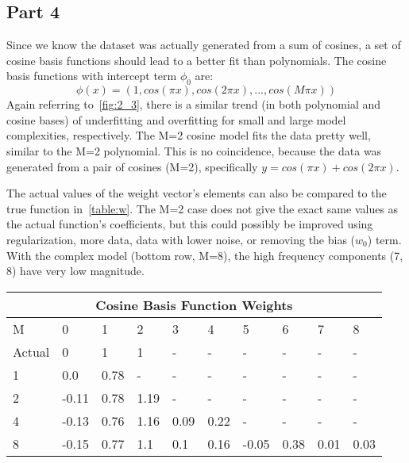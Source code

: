 \subsection{Part 4}
Since we know the dataset was actually generated from a sum of cosines, a set of cosine basis functions should lead to a better fit than polynomials.
The cosine basis functions with intercept term $\phi_0$ are:
\begin{equation}
	\phi(x)=(1, cos(\pi x), cos(2\pi x), ... , cos(M\pi x))
\end{equation}
Again referring to~\cref{fig:2_3}, there is a similar trend (in both polynomial and cosine bases) of underfitting and overfitting for small and large model complexities, respectively.
The M=2 cosine model fits the data pretty well, similar to the M=2 polynomial.
This is no coincidence, because the data was generated from a pair of cosines (M=2), specifically $y = cos(\pi x) + cos(2\pi x)$.

The actual values of the weight vector's elements can also be compared to the true function in~\cref{table:w}.
The M=2 case does not give the exact same values as the actual function's coefficients, but this could possibly be improved using regularization, more data, data with lower noise, or removing the bias ($w_0$) term.
With the complex model (bottom row, M=8), the high frequency components (7, 8) have very low magnitude.

\begin{table*}[t]
  \centering
  \caption[]{Cosine Basis Function Weights}
	\begin{tabular}{|p{1cm}||p{1cm}|p{1cm}|p{1cm}|p{1cm}|p{1cm}|p{1cm}|p{1cm}|p{1cm}|p{1cm}|}
	 \hline
	 \multicolumn{10}{|c|}{Cosine Basis Function Weights} \\
	 \hline
	 M & 0 & 1 & 2 & 3 & 4 & 5 & 6 & 7 & 8 \\
	 \hline\hline
	 Actual & 0 & 1 & 1 & - & - & - & - & - & - \\
	 1 & 0.0 & 0.78 & - & - & - & - & - & - & - \\
	 2 & -0.11 & 0.78 & 1.19 & - & - & - & - & - & - \\
	 4 & -0.13 & 0.76 & 1.16 & 0.09 & 0.22 & - & - & - & - \\
	 8 & -0.15 & 0.77 & 1.1 & 0.1 & 0.16 & -0.05 & 0.38 & 0.01 & 0.03  \\
	 \hline
	\end{tabular}
	\label{table:w}
\end{table*}

